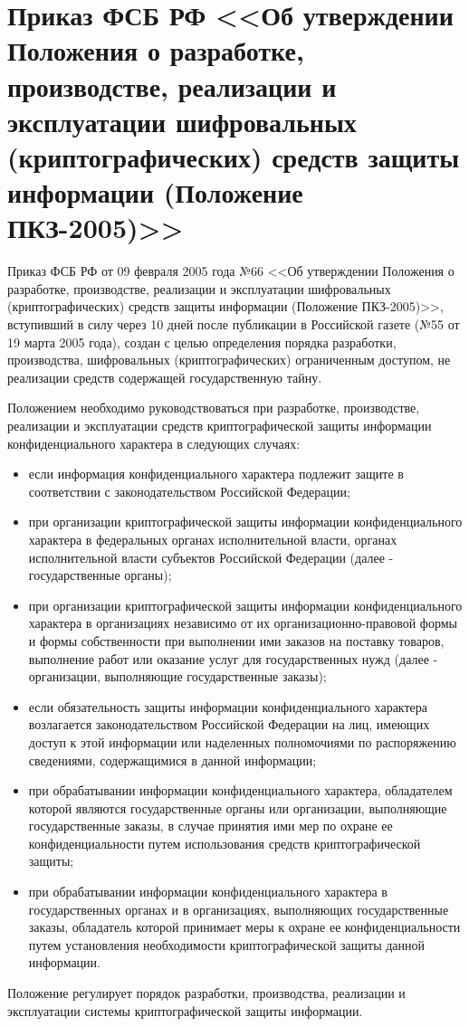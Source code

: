 \section{Приказ ФСБ РФ <<Об утверждении Положения о разработке, производстве, реализации и эксплуатации шифровальных (криптографических) средств защиты информации (Положение ПКЗ-2005)>>} \label{rights_fsb_66}

Приказ ФСБ РФ от 09 февраля 2005 года №66 <<Об утверждении Положения о разработке, производстве, реализации и эксплуатации шифровальных (криптографических) средств защиты информации (Положение ПКЗ-2005)>>, вступивший в силу через 10 дней после публикации в Российской газете (№55 от 19 марта 2005 года), создан с целью определения
порядка разработки, производства, шифровальных (криптографических) ограниченным доступом, не реализации средств содержащей государственную тайну.

\vspace{\baselineskip}
Положением необходимо руководствоваться при разработке, производстве, реализации и эксплуатации средств криптографической защиты информации конфиденциального характера в следующих случаях:
\begin{itemize}
	\item если информация конфиденциального характера подлежит защите в соответствии с законодательством Российской Федерации;
	\item при организации криптографической защиты информации конфиденциального характера в федеральных органах исполнительной власти, органах исполнительной власти субъектов Российской Федерации (далее - государственные органы);
	\item при организации криптографической защиты информации конфиденциального характера в организациях независимо от их организационно-правовой формы и формы собственности при выполнении ими заказов на поставку товаров, выполнение работ или оказание услуг для государственных нужд (далее - организации, выполняющие государственные заказы);
	\item если обязательность защиты информации конфиденциального характера возлагается законодательством Российской Федерации на лиц, имеющих доступ к этой информации или наделенных полномочиями по распоряжению сведениями, содержащимися в данной информации;
	\item при обрабатывании информации конфиденциального характера, обладателем которой являются государственные органы или организации, выполняющие государственные заказы, в случае принятия ими мер по охране ее конфиденциальности путем использования средств криптографической защиты;
	\item при обрабатывании информации конфиденциального характера в государственных органах и в организациях, выполняющих государственные заказы, обладатель которой принимает меры к охране ее конфиденциальности путем установления необходимости криптографической защиты данной информации.
\end{itemize}

Положение регулирует порядок разработки, производства, реализации и эксплуатации системы криптографической защиты информации.
